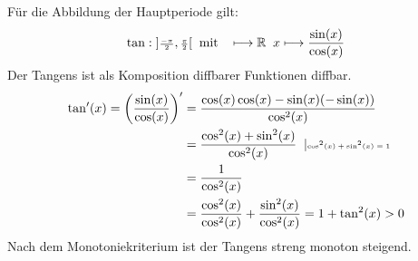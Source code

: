 Für die Abbildung der Hauptperiode gilt:\\
\begin{align*}
\tan:\;]\genfrac{}{}{}{2}{-\pi }{2},\genfrac{}{}{}{2}{\pi}{2}[\;\;\text{mit }\;\; \longmapsto \mathbb{R}\;\;x\longmapsto \frac{\sin(x)}{\cos(x)}
\end{align*}
Der Tangens ist als Komposition diffbarer Funktionen diffbar.\\
\begin{align*}
\tan'(x)=\bigg(\frac{\sin(x)}{\cos(x)}\bigg)'&=\frac{\cos(x)\cos(x)-\sin(x)(-\sin(x))}{\cos^2(x)}\\
&=\frac{\cos^2(x)+\sin^2(x)}{\cos^2(x)}\;\;|\text{\tiny $ \cos^2(x)+\sin^2(x)=1 $ }\\
&=\frac{1}{\cos^2(x)}\\
&=\frac{\cos^2(x)}{\cos^2(x)}+\frac{\sin^2(x)}{\cos^2(x)}=1+\tan^2(x)>0\\
\end{align*}
Nach dem Monotoniekriterium ist der Tangens streng monoton steigend.\\
